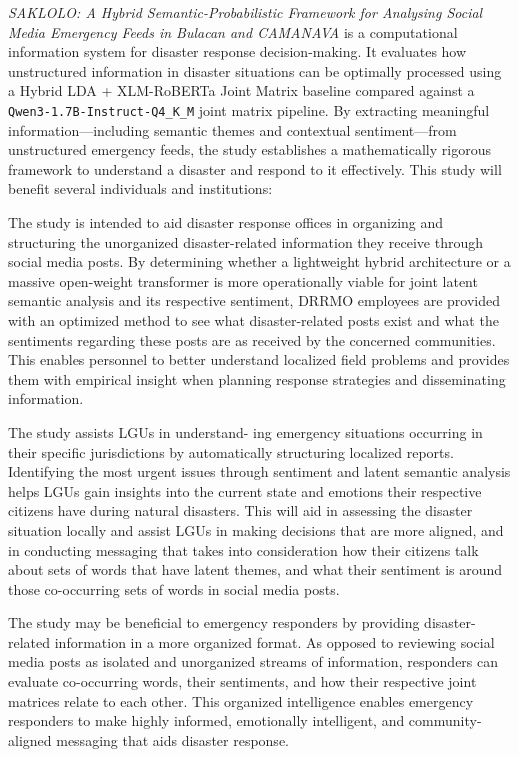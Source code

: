 \documentclass[12pt,a4paper]{report}
\newcommand{\qwen}{\texttt{Qwen3-1.7B-Instruct-Q4\_K\_M}}
\newcommand{\xlmr}{XLM-RoBERTa}
\begin{document}
\emph{SAKLOLO: A Hybrid Semantic-Probabilistic Framework for Analysing Social
Media Emergency Feeds in Bulacan and CAMANAVA} is a computational information
system for disaster response decision-making. It evaluates how unstructured
information in disaster situations can be optimally processed using a Hybrid
LDA + \xlmr{} Joint Matrix baseline compared against a \qwen{} joint matrix
pipeline. By extracting meaningful information---including semantic themes and
contextual sentiment---from unstructured emergency feeds, the study establishes
a mathematically rigorous framework to understand a disaster and respond to it
effectively. This study will benefit several individuals and institutions:

\begin{description}[style=nextline,leftmargin=0pt]
  \item[Bulacan and CAMANAVA Disaster Response Offices.] The study is
  intended to aid disaster response offices in organizing and structuring the
  unorganized disaster-related information they receive through social media
  posts. By determining whether a lightweight hybrid architecture or a massive
  open-weight transformer is more operationally viable for joint latent
  semantic analysis and its respective sentiment, DRRMO employees are provided
  with an optimized method to see what disaster-related posts exist and what
  the sentiments regarding these posts are as received by the concerned
  communities. This enables personnel to better understand localized field
  problems and provides them with empirical insight when planning response
  strategies and disseminating information.

  \item[Local Government Units (LGUs).] The study assists LGUs in understand-
  ing emergency situations occurring in their specific jurisdictions by
  automatically structuring localized reports. Identifying the most urgent
  issues through sentiment and latent semantic analysis helps LGUs gain
  insights into the current state and emotions their respective citizens have
  during natural disasters. This will aid in assessing the disaster situation
  locally and assist LGUs in making decisions that are more aligned, and in
  conducting messaging that takes into consideration how their citizens talk
  about sets of words that have latent themes, and what their sentiment is
  around those co-occurring sets of words in social media posts.

  \item[Emergency Responders.] The study may be beneficial to emergency
  responders by providing disaster-related information in a more organized
  format. As opposed to reviewing social media posts as isolated and
  unorganized streams of information, responders can evaluate co-occurring
  words, their sentiments, and how their respective joint matrices relate to
  each other. This organized intelligence enables emergency responders to make
  highly informed, emotionally intelligent, and community-aligned messaging
  that aids disaster response.


\end{description}
\end{document}

